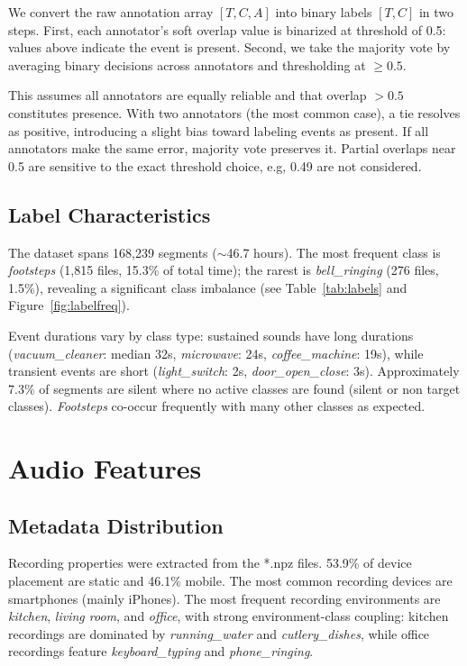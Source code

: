 \documentclass{article}
\begin{document}
We convert the raw annotation array $[T, C, A]$ into binary labels $[T, C]$ in two steps. First, each annotator's soft overlap value is binarized at threshold of 0.5: values above indicate the event is present. Second, we take the majority vote by averaging binary decisions across annotators and thresholding at $\geq 0.5$.

This assumes all annotators are equally reliable and that overlap $>0.5$ constitutes presence. With two annotators (the most common case), a tie resolves as positive, introducing a slight bias toward labeling events as present. If all annotators make the same error, majority vote preserves it. Partial overlaps near 0.5 are sensitive to the exact threshold choice, e.g, 0.49 are not considered. 

\subsection{Label Characteristics}
The dataset spans 168,239 segments ($\sim$46.7 hours). The most frequent class is \textit{footsteps} (1,815 files, 15.3\% of total time); the rarest is \textit{bell\_ringing } (276 files, 1.5\%), revealing a significant class imbalance (see Table~\ref{tab:labels} and Figure~\ref{fig:labelfreq}).

Event durations vary by class type: sustained sounds have long durations (\textit{vacuum\_cleaner}: median 32s, \textit{microwave}: 24s, \textit{coffee\_machine}: 19s), while transient events are short (\textit{light\_switch}: 2s, \textit{door\_open\_close}: 3s). Approximately 7.3\% of segments are silent where no active classes are found (silent or non target classes). \textit{Footsteps} co-occur frequently with many other classes as expected.

 
\section{Audio Features}

\subsection{Metadata Distribution}
Recording properties were extracted from the *.npz files. 53.9\% of device placement are static and 46.1\% mobile. The most common recording devices are smartphones (mainly iPhones). The most frequent recording environments are \textit{kitchen}, \textit{living room}, and \textit{office}, with strong environment-class coupling: kitchen recordings are dominated by \textit{running\_water} and \textit{cutlery\_dishes}, while office recordings feature \textit{keyboard\_typing} and \textit{phone\_ringing}.
\end{document}

